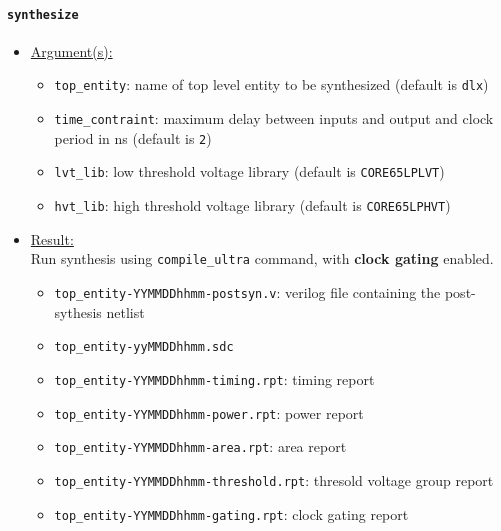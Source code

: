 \paragraph{\texttt{synthesize}}
\begin{itemize}
	\item \underline{Argument(s):}
		\begin{itemize}
			\item \texttt{top\_entity}: name of top level entity to
				be synthesized (default is \texttt{dlx})
			\item \texttt{time\_contraint}: maximum delay between
				inputs and output and clock period in ns
				(default is \texttt{2})
			\item \texttt{lvt\_lib}: low threshold voltage library
				(default is \texttt{CORE65LPLVT})
			\item \texttt{hvt\_lib}: high threshold voltage library
				(default is \texttt{CORE65LPHVT})
		\end{itemize}
	\item \underline{Result:} \\
		Run synthesis using \texttt{compile\_ultra} command, with
		\textbf{clock gating} enabled.
		\begin{itemize}
			\item \texttt{top\_entity-YYMMDDhhmm-postsyn.v}: verilog
				file containing the post-sythesis netlist
			\item \texttt{top\_entity-yyMMDDhhmm.sdc}
			\item \texttt{top\_entity-YYMMDDhhmm-timing.rpt}: timing
				report
			\item \texttt{top\_entity-YYMMDDhhmm-power.rpt}: power
				report
			\item \texttt{top\_entity-YYMMDDhhmm-area.rpt}: area
				report
			\item \texttt{top\_entity-YYMMDDhhmm-threshold.rpt}:
				thresold voltage group report
			\item \texttt{top\_entity-YYMMDDhhmm-gating.rpt}: clock
				gating report
		\end{itemize}
\end{itemize}

